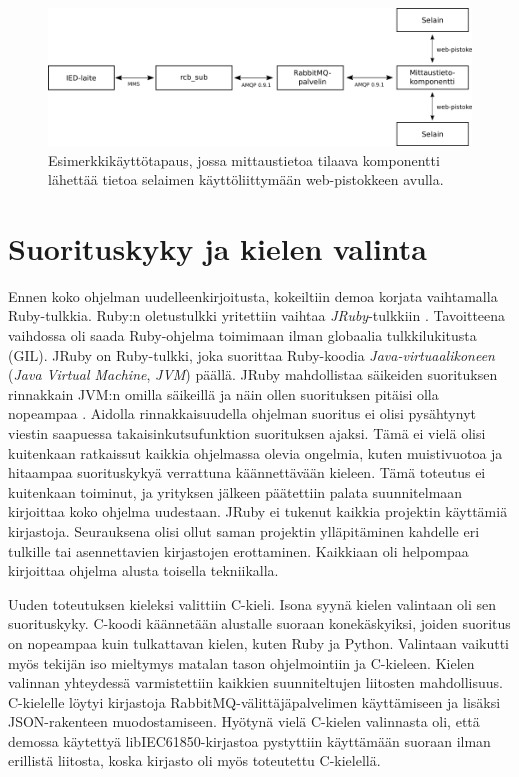 \begin{figure}[ht!]
	\includegraphics[width=1\textwidth]{pictures/example-use-case.png}
	\caption{Esimerkkikäyttötapaus, jossa mittaustietoa tilaava komponentti lähettää tietoa selaimen käyttöliittymään web-pistokkeen avulla.}
	\label{fig:example-use-case}
\end{figure}


\section{Suorituskyky ja kielen valinta}
Ennen koko ohjelman uudelleenkirjoitusta, kokeiltiin demoa korjata vaihtamalla Ruby-tulkkia. Ruby:n oletustulkki yritettiin vaihtaa \emph{JRuby}-tulkkiin \cite{jruby-homepage}. Tavoitteena vaihdossa oli saada Ruby-ohjelma toimimaan ilman globaalia tulkkilukitusta (GIL). JRuby on Ruby-tulkki, joka suorittaa Ruby-koodia \emph{Java-virtuaalikoneen} (\emph{Java Virtual Machine}, \emph{JVM}) päällä. JRuby mahdollistaa säikeiden suorituksen rinnakkain JVM:n omilla säikeillä ja näin ollen suorituksen pitäisi olla nopeampaa \mbox{\cite{Youssef2013}}. Aidolla rinnakkaisuudella ohjelman suoritus ei olisi pysähtynyt viestin saapuessa takaisinkutsufunktion suorituksen ajaksi. Tämä ei vielä olisi kuitenkaan ratkaissut kaikkia ohjelmassa olevia ongelmia, kuten muistivuotoa ja hitaampaa suorituskykyä verrattuna käännettävään kieleen. Tämä toteutus ei kuitenkaan toiminut, ja yrityksen jälkeen päätettiin palata suunnitelmaan kirjoittaa koko ohjelma uudestaan. JRuby ei tukenut kaikkia projektin käyttämiä kirjastoja. Seurauksena olisi ollut saman projektin ylläpitäminen kahdelle eri tulkille tai asennettavien kirjastojen erottaminen. Kaikkiaan oli helpompaa kirjoittaa ohjelma alusta toisella tekniikalla.

Uuden toteutuksen kieleksi valittiin C-kieli. Isona syynä kielen valintaan oli sen suorituskyky. C-koodi käännetään alustalle suoraan konekäskyiksi, joiden suoritus on nopeampaa kuin tulkattavan kielen, kuten Ruby ja Python. Valintaan vaikutti myös tekijän iso mieltymys matalan tason ohjelmointiin ja C-kieleen. Kielen valinnan yhteydessä varmistettiin kaikkien suunniteltujen liitosten mahdollisuus. C-kielelle löytyi kirjastoja RabbitMQ-välittäjäpalvelimen käyttämiseen ja lisäksi JSON-rakenteen muodostamiseen. Hyötynä vielä C-kielen valinnasta oli, että demossa käytettyä libIEC61850-kirjastoa pystyttiin käyttämään suoraan ilman erillistä liitosta, koska kirjasto oli myös toteutettu C-kielellä.


